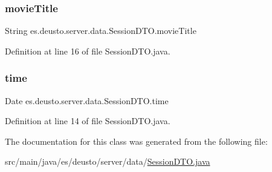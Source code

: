 \subsubsection{\texorpdfstring{movieTitle}{movieTitle}}
{\footnotesize\ttfamily String es.\+deusto.\+server.\+data.\+Session\+D\+T\+O.\+movie\+Title}



Definition at line 16 of file Session\+D\+T\+O.\+java.

\mbox{\label{classes_1_1deusto_1_1server_1_1data_1_1_session_d_t_o_a38cf2d216aa3498c72da81c0f97ae3a0}} 
\subsubsection{\texorpdfstring{time}{time}}
{\footnotesize\ttfamily Date es.\+deusto.\+server.\+data.\+Session\+D\+T\+O.\+time}



Definition at line 14 of file Session\+D\+T\+O.\+java.



The documentation for this class was generated from the following file\+:\begin{DoxyCompactItemize}
\item 
src/main/java/es/deusto/server/data/\mbox{\hyperlink{_session_d_t_o_8java}{Session\+D\+T\+O.\+java}}\end{DoxyCompactItemize}
